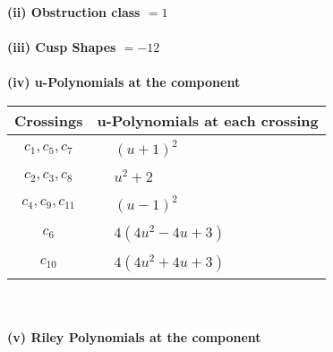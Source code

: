 \documentclass[1p]{elsarticle_modified}
\theoremstyle{definition}
\begin{document}
\flushleft \textbf{(ii) Obstruction class $= 1$}\\~\\
\flushleft \textbf{(iii) Cusp Shapes $= -12$}\\~\\
\newpage\renewcommand{\arraystretch}{1}
\flushleft \textbf{(iv) u-Polynomials at the component}\newline \\
\begin{tabular}{m{50pt}|m{274pt}}
Crossings & \hspace{64pt}u-Polynomials at each crossing \\
\hline $$\begin{aligned}c_{1},c_{5},c_{7}\end{aligned}$$&$\begin{aligned}
&(u+1)^2
\end{aligned}$\\
\hline $$\begin{aligned}c_{2},c_{3},c_{8}\end{aligned}$$&$\begin{aligned}
&u^2+2
\end{aligned}$\\
\hline $$\begin{aligned}c_{4},c_{9},c_{11}\end{aligned}$$&$\begin{aligned}
&(u-1)^2
\end{aligned}$\\
\hline $$\begin{aligned}c_{6}\end{aligned}$$&$\begin{aligned}
&4(4 u^2-4 u+3)
\end{aligned}$\\
\hline $$\begin{aligned}c_{10}\end{aligned}$$&$\begin{aligned}
&4(4 u^2+4 u+3)
\end{aligned}$\\
\hline
\end{tabular}\\~\\
\newpage\renewcommand{\arraystretch}{1}
\flushleft \textbf{(v) Riley Polynomials at the component}\newline \\
\end{document}
